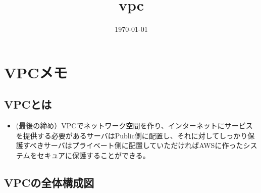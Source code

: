 \documentclass[11pt]{article}
\title{vpc}
\author{}
\date{\today}
\begin{document}
\maketitle

\setcounter{tocdepth}{3}
\tableofcontents
\vspace*{1cm}
\section{VPCメモ}
\label{sec-1}
\subsection{VPCとは}
\label{sec-1-1}

\begin{itemize}
\item (最後の締め）VPCでネットワーク空間を作り、インターネットにサービスを提供する必要があるサーバはPublic側に配置し、それに対してしっかり保護すべきサーバはプライベート側に配置していただければAWSに作ったシステムをセキュアに保護することができる。
\end{itemize}
\subsection{VPCの全体構成図}
\label{sec-1-2}
\end{document}
